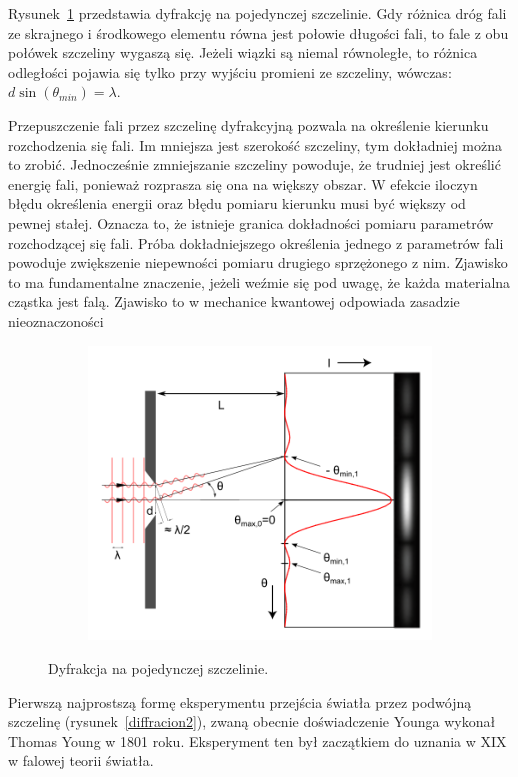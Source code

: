 Rysunek~\ref{diffracion} przedstawia dyfrakcję na pojedynczej szczelinie. Gdy różnica dróg fali ze skrajnego i środkowego elementu równa jest połowie długości fali, to fale z obu połówek szczeliny wygaszą się. Jeżeli wiązki są niemal równoległe, to różnica odległości pojawia się tylko przy wyjściu promieni ze szczeliny, wówczas:\newline
$ d\sin(\theta_{min}) = \lambda $.\newline

Przepuszczenie fali przez szczelinę dyfrakcyjną pozwala na określenie kierunku rozchodzenia się fali. Im mniejsza jest szerokość szczeliny, tym dokładniej można to zrobić. Jednocześnie zmniejszanie szczeliny powoduje, że trudniej jest określić energię fali, ponieważ rozprasza się ona na większy obszar. W efekcie iloczyn błędu określenia energii oraz błędu pomiaru kierunku musi być większy od pewnej stałej. Oznacza to, że istnieje granica dokładności pomiaru parametrów rozchodzącej się fali. Próba dokładniejszego określenia jednego z parametrów fali powoduje zwiększenie niepewności pomiaru drugiego sprzężonego z nim. Zjawisko to ma fundamentalne znaczenie, jeżeli weźmie się pod uwagę, że każda materialna cząstka jest falą. Zjawisko to w mechanice kwantowej odpowiada zasadzie nieoznaczoności

\begin{figure} [H]
	\centering
	\begin{subfigure}{.99\textwidth}
		\centering
		\includegraphics[width=0.6\linewidth]{generalIssues/Figures/diffraction.png}
	\end{subfigure}
	\caption{Dyfrakcja na pojedynczej szczelinie.}
	\label{diffracion}
\end{figure}

Pierwszą najprostszą formę eksperymentu przejścia światła przez podwójną szczelinę (rysunek~\ref{diffracion2}), zwaną obecnie doświadczenie Younga wykonał Thomas Young w 1801 roku. Eksperyment ten był zaczątkiem do uznania w XIX w falowej teorii światła. 

